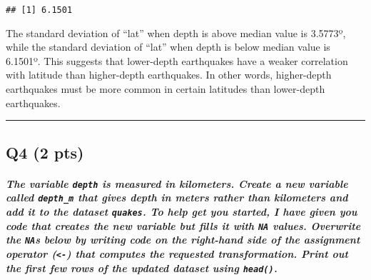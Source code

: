 \documentclass[
]{article}
\begin{document}
\begin{verbatim}
## [1] 6.1501
\end{verbatim}

The standard deviation of ``lat'' when depth is above median value is
3.5773º, while the standard deviation of ``lat'' when depth is below
median value is 6.1501º. This suggests that lower-depth earthquakes have
a weaker correlation with latitude than higher-depth earthquakes. In
other words, higher-depth earthquakes must be more common in certain
latitudes than lower-depth earthquakes.

\begin{center}\rule{0.5\linewidth}{0.5pt}\end{center}

\hypertarget{q4-2-pts}{%
\subsection{Q4 (2 pts)}\label{q4-2-pts}}

\hypertarget{the-variable-depth-is-measured-in-kilometers.-create-a-new-variable-called-depth_m-that-gives-depth-in-meters-rather-than-kilometers-and-add-it-to-the-dataset-quakes.-to-help-get-you-started-i-have-given-you-code-that-creates-the-new-variable-but-fills-it-with-na-values.-overwrite-the-nas-below-by-writing-code-on-the-right-hand-side-of-the-assignment-operator---that-computes-the-requested-transformation.-print-out-the-first-few-rows-of-the-updated-dataset-using-head.}{%
\subparagraph{\texorpdfstring{The variable \texttt{depth} is measured in
kilometers. Create a new variable called \texttt{depth\_m} that gives
depth \textbf{in meters rather than kilometers} and add it to the
dataset \texttt{quakes}. To help get you started, I have given you code
that creates the new variable but fills it with \texttt{NA} values.
Overwrite the \texttt{NA}s below by writing code on the right-hand side
of the assignment operator (\texttt{\textless{}-}) that computes the
requested transformation. Print out the first few rows of the updated
dataset using
\texttt{head()}.}{The variable depth is measured in kilometers. Create a new variable called depth\_m that gives depth in meters rather than kilometers and add it to the dataset quakes. To help get you started, I have given you code that creates the new variable but fills it with NA values. Overwrite the NAs below by writing code on the right-hand side of the assignment operator (\textless-) that computes the requested transformation. Print out the first few rows of the updated dataset using head().}}\label{the-variable-depth-is-measured-in-kilometers.-create-a-new-variable-called-depth_m-that-gives-depth-in-meters-rather-than-kilometers-and-add-it-to-the-dataset-quakes.-to-help-get-you-started-i-have-given-you-code-that-creates-the-new-variable-but-fills-it-with-na-values.-overwrite-the-nas-below-by-writing-code-on-the-right-hand-side-of-the-assignment-operator---that-computes-the-requested-transformation.-print-out-the-first-few-rows-of-the-updated-dataset-using-head.}}
\end{document}
